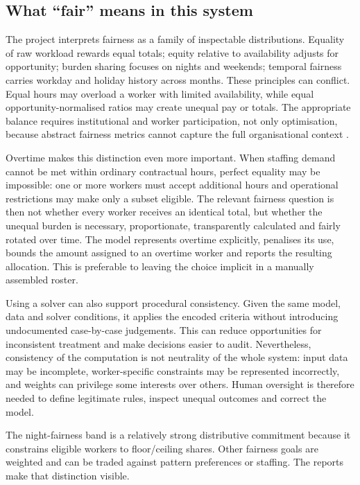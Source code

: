 \documentclass[11pt,a4paper]{article}
\begin{document}
\subsection{What ``fair'' means in this system}

The project interprets fairness as a family of inspectable distributions. Equality of raw workload rewards equal totals; equity relative to availability adjusts for opportunity; burden sharing focuses on nights and weekends; temporal fairness carries workday and holiday history across months. These principles can conflict. Equal hours may overload a worker with limited availability, while equal opportunity-normalised ratios may create unequal pay or totals. The appropriate balance requires institutional and worker participation, not only optimisation, because abstract fairness metrics cannot capture the full organisational context \cite{selbst}.

Overtime makes this distinction even more important. When staffing demand cannot be met within ordinary contractual hours, perfect equality may be impossible: one or more workers must accept additional hours and operational restrictions may make only a subset eligible. The relevant fairness question is then not whether every worker receives an identical total, but whether the unequal burden is necessary, proportionate, transparently calculated and fairly rotated over time. The model represents overtime explicitly, penalises its use, bounds the amount assigned to an overtime worker and reports the resulting allocation. This is preferable to leaving the choice implicit in a manually assembled roster.

Using a solver can also support procedural consistency. Given the same model, data and solver conditions, it applies the encoded criteria without introducing undocumented case-by-case judgements. This can reduce opportunities for inconsistent treatment and make decisions easier to audit. Nevertheless, consistency of the computation is not neutrality of the whole system: input data may be incomplete, worker-specific constraints may be represented incorrectly, and weights can privilege some interests over others. Human oversight is therefore needed to define legitimate rules, inspect unequal outcomes and correct the model.

The night-fairness band is a relatively strong distributive commitment because it constrains eligible workers to floor/ceiling shares. Other fairness goals are weighted and can be traded against pattern preferences or staffing. The reports make that distinction visible.
\end{document}
